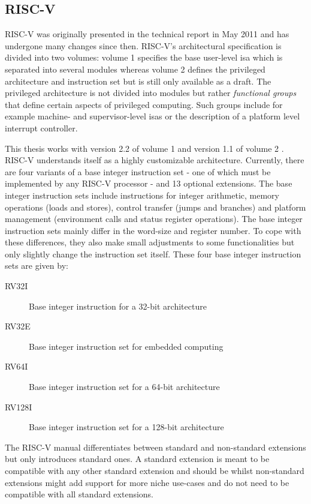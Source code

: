 \subsection{RISC-V}
\label{sec:bg-riscv}

RISC-V was originally presented in the technical report  in May 2011 \cite{RiscVISA-org} and has undergone many changes since then.
RISC-V's architectural specification is divided into two volumes: volume 1 specifies the base user-level \gls{isa} which is separated into several modules whereas volume 2 defines the privileged architecture and instruction set but is still only available as a draft.
The privileged architecture is not divided into modules but rather \textit{functional groups} that define certain aspects of privileged computing.
Such groups include for example machine- and supervisor-level \glspl{isa} or the description of a platform level interrupt controller.

This thesis works with version 2.2 of volume 1 \cite{RiscVISA} and version 1.1 of volume 2 \cite{RiscVISAP}.
RISC-V understands itself as a highly customizable architecture.
Currently, there are four variants of a base integer instruction set - one of which must be implemented by any RISC-V processor - and 13 optional extensions.
The base integer instruction sets include instructions for integer arithmetic, memory operations (loads and stores), control transfer (jumps and branches) and platform management (environment calls and status register operations).
The base integer instruction sets mainly differ in the word-size and register number.
To cope with these differences, they also make small adjustments to some functionalities but only slightly change the instruction set itself.
These four base integer instruction sets are given by:
\begin{description}
    \item[RV32I] Base integer instruction  for a 32-bit architecture
    \item[RV32E] Base integer instruction set for embedded computing
    \item[RV64I] Base integer instruction set for a 64-bit architecture
    \item[RV128I] Base integer instruction set for a 128-bit architecture
\end{description}

The RISC-V manual differentiates between standard and non-standard extensions but only introduces standard ones.
A standard extension is meant to be compatible with any other standard extension and should be  whilst non-standard extensions might add support for more niche use-cases and do not need to be compatible with all standard extensions.

